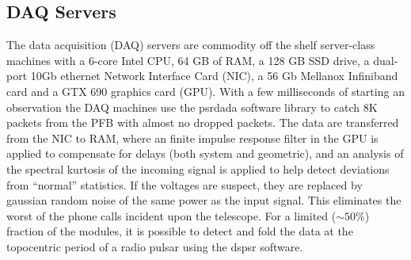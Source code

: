 \subsection {DAQ Servers}

The data acquisition (DAQ) servers are commodity off the shelf server-class machines with a 6-core Intel CPU, 64 GB of RAM, a 128 GB SSD drive, a dual-port 10Gb ethernet Network Interface Card (NIC), a 56 Gb Mellanox Infiniband card and a GTX 690 graphics card (GPU). With a few milliseconds of starting an observation the DAQ machines use the {\sc psrdada} software library to catch 8K packets from the PFB with almost no dropped packets. The data are transferred from the NIC to RAM, where an finite impulse response filter in the GPU is applied to compensate for delays (both system and geometric), and an analysis of the spectral kurtosis of the incoming signal is applied to help detect deviations from ``normal'' statistics. If the voltages are suspect, they are replaced by gaussian random noise of the same power as the input signal. This eliminates the worst of the phone calls incident upon the telescope. For a limited ($\sim50$\%) fraction of the modules, it is possible to detect and fold the data at the topocentric period of a radio pulsar using the {\sc dspsr} software.